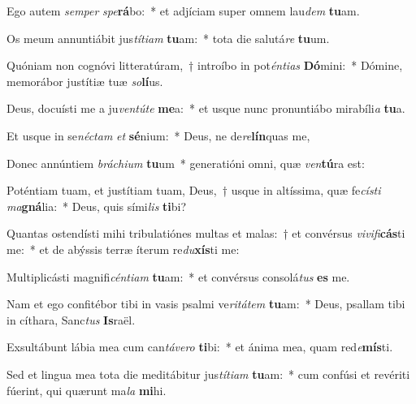 \item Ego autem \textit{sem}\textit{per} \textit{spe}\textbf{rá}bo:~* et adjíciam super omnem lau\textit{dem} \textbf{tu}am.
\item Os meum annuntiábit jus\textit{tí}\textit{ti}\textit{am} \textbf{tu}am:~* tota die salutá\textit{re} \textbf{tu}um.
\item Quóniam non cognóvi litteratúram,~† introíbo in pot\textit{én}\textit{ti}\textit{as} \textbf{Dó}mini:~* Dómine, memorábor justítiæ tuæ \textit{so}\textbf{lí}us.
\item Deus, docuísti me a ju\textit{ven}\textit{tú}\textit{te} \textbf{me}a:~* et usque nunc pronuntiábo mirabíli\textit{a} \textbf{tu}a.
\item Et usque in se\textit{néc}\textit{tam} \textit{et} \textbf{sé}nium:~* Deus, ne de\textit{re}\textbf{lín}quas me,
\item Donec annúntiem \textit{brá}\textit{chi}\textit{um} \textbf{tu}um~* generatióni omni, quæ \textit{ven}\textbf{tú}ra est:
\item Poténtiam tuam, et justítiam tuam, Deus,~† usque in altíssima, quæ fe\textit{cís}\textit{ti} \textit{ma}\textbf{gná}lia:~* Deus, quis sími\textit{lis} \textbf{ti}bi?
\item Quantas ostendísti mihi tribulatiónes multas et malas:~† et convérsus \textit{vi}\textit{vi}\textit{fi}\textbf{cás}ti me:~* et de abýssis terræ íterum re\textit{du}\textbf{xís}ti me:
\item Multiplicásti magnifi\textit{cén}\textit{ti}\textit{am} \textbf{tu}am:~* et convérsus consolá\textit{tus} \textbf{es} me.
\item Nam et ego confitébor tibi in vasis psalmi ve\textit{ri}\textit{tá}\textit{tem} \textbf{tu}am:~* Deus, psallam tibi in cíthara, Sanc\textit{tus} \textbf{Is}raël.
\item Exsultábunt lábia mea cum can\textit{tá}\textit{ve}\textit{ro} \textbf{ti}bi:~* et ánima mea, quam red\textit{e}\textbf{mís}ti.
\item Sed et lingua mea tota die meditábitur jus\textit{tí}\textit{ti}\textit{am} \textbf{tu}am:~* cum confúsi et revériti fúerint, qui quærunt ma\textit{la} \textbf{mi}hi.
